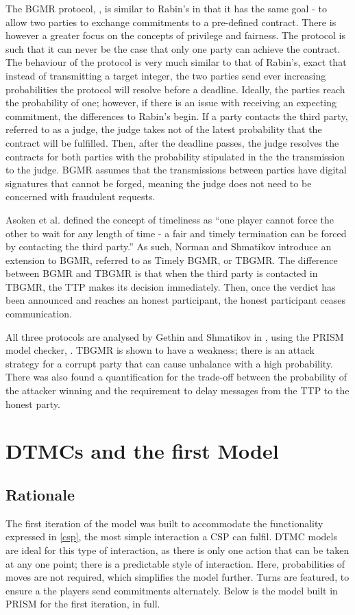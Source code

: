 \documentclass{l4proj}
\begin{document}
The BGMR protocol, \cite{ben1990fair}, is similar to Rabin's in that it has the same goal - to allow  two parties to exchange commitments to a pre-defined contract. There is however a greater focus on the concepts of privilege and fairness. The protocol is such that it can never be the case that only one party can achieve the contract. The behaviour of the protocol is very much similar to that of Rabin's, exact that instead of transmitting a target integer, the two parties send ever increasing probabilities the protocol will resolve before a deadline. Ideally, the parties reach the probability of one; however, if there is an issue with receiving an expecting commitment, the differences to Rabin's begin. If a party contacts the third party, referred to as a judge, the judge takes not of the latest probability that the contract will be fulfilled. Then, after the deadline passes, the judge resolves the contracts for both parties with the probability stipulated in the the transmission to the judge. BGMR assumes that the transmissions between parties have  digital signatures that cannot be forged, meaning the judge does not need to be concerned with fraudulent requests.

Asoken et al. \cite{asokan1998optimistic} defined the concept of timeliness as ``one player cannot force the other to wait for any length of time - a fair and timely termination can be forced by contacting the third party.'' As such, Norman and Shmatikov \cite{norman2006analysis} introduce an extension to BGMR, referred to as Timely BGMR, or TBGMR. The difference between BGMR and TBGMR is that when the third party is contacted in TBGMR, the TTP makes its decision immediately. Then, once the verdict has been announced and reaches an honest participant, the honest participant ceases communication.

All three protocols are analysed by Gethin and Shmatikov in \cite{norman2006analysis}, using the PRISM model checker, \cite{Pri}. TBGMR is shown to have a weakness; there is an attack strategy for a corrupt party that can cause unbalance with a high probability. There was also found a quantification for the trade-off between the probability of the attacker winning and the requirement to delay messages from the TTP to the honest party.




\chapter{DTMCs and the first Model}
\section{Rationale}
 The first iteration of the model was built to accommodate the functionality expressed in \ref{csp}, the most simple interaction a CSP can fulfil. DTMC models are ideal for this type of interaction, as there is only one action that can be taken at any one point; there is a predictable style of interaction. Here, probabilities of moves are not required, which simplifies the model further. Turns are featured, to ensure a the players send commitments alternately. Below is the model built in PRISM for the first iteration, in full.\\
\end{document}
